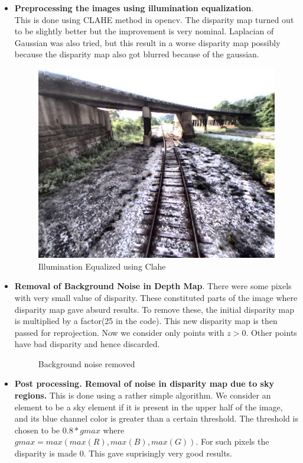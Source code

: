 \documentclass{article}
\begin{document}
\begin{itemize}
\item \textbf{Preprocessing the images using illumination equalization}.\\ This is done using CLAHE method in opencv. The disparity map turned out to be slightly better but the improvement is very nominal. Laplacian of Gaussian was also tried, but this result in a worse disparity map possibly because the disparity map also got blurred because of the gaussian.
  \begin{figure}[H]
    \centering
    \includegraphics[scale=0.25]{images/clahe}
    \caption{Illumination Equalized using Clahe}
  \end{figure}
\item \textbf{Removal of Background Noise in Depth Map}. There were some pixels with very small value of disparity. These constituted parts of the image where disparity map gave absurd results. To remove these, the initial disparity map is multiplied by a factor(25 in the code). This new disparity map is then passed for reprojection. Now we consider only points with $z>0$. Other points have bad disparity and hence discarded.
  \begin{figure}[H]
    \centering
    \caption{Background noise removed}
  \end{figure}
\item \textbf{Post processing. Removal of noise in disparity map due to sky regions.} This is done using a rather simple algorithm. We consider an element to be a sky element if it is present in the upper half of the image, and its blue channel color is greater than a certain threshold. The threshold is chosen to be $0.8 * gmax$ where $gmax = max(max(R),max(B),max(G))$. For such pixels the disparity is made 0. This gave suprisingly very good results. 

\end{itemize}
\end{document}

